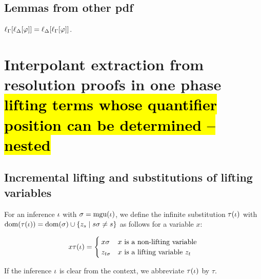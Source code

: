 \documentclass[,%
	draft=false,%
	numbers=noendperiod
	11pt,
	a4paper,
	oneside,%
	openany,
]{memoir}
\begin{document}
\tableofcontents

\section{Lemmas from other pdf}
\begin{lemma}
	\label{lemma:lifting_order_not_relevant}
	$\ell_{\Gamma}[\ell_{\Delta}[\varphi]] = \ell_{\Delta}[\ell_{\Gamma}[\varphi]]$.
\end{lemma}

\clearpage

\chapter{Interpolant extraction from resolution proofs in one phase \hl{lifting terms whose quantifier position can be determined -- nested}}

\section{Incremental lifting and substitutions of lifting variables}

\begin{defi}
	For an inference $\iota$ with $\sigma = \operatorname{mgu}(\iota)$, we define the infinite substitution $\tau(\iota)$ with $\operatorname{dom}(\tau(\iota)) = \operatorname{dom}(\sigma) \cup \{z_s \mid s\sigma \neq s\}$ as follows for a variable $x$:

	\[
		x\tau(\iota) =
		\begin{cases}
			x\sigma & \text{$x$ is a non-lifting variable} \\
			z_{t\sigma} & \text{$x$ is a lifting variable $z_t$}
		\end{cases} 
	\]

	If the inference $\iota$ is clear from the context, we abbreviate $\tau(\iota)$ by $\tau$. 
\end{defi}
\end{document}
